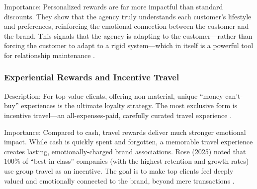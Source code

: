 Importance: Personalized rewards are far more impactful than standard discounts. They show that the agency truly understands each customer's lifestyle and preferences, reinforcing the emotional connection between the customer and the brand. This signals that the agency is adapting to the customer—rather than forcing the customer to adapt to a rigid system—which in itself is a powerful tool for relationship maintenance \cite{othman2025}.

\subsubsection{Experiential Rewards and Incentive Travel}
Description: For top-value clients, offering non-material, unique “money-can't-buy” experiences is the ultimate loyalty strategy. The most exclusive form is incentive travel—an all-expenses-paid, carefully curated travel experience \cite{whalen2017engaging}.

Importance: Compared to cash, travel rewards deliver much stronger emotional impact. While cash is quickly spent and forgotten, a memorable travel experience creates lasting, emotionally-charged brand associations. Rose (2025) noted that 100\% of “best-in-class” companies (with the highest retention and growth rates) use group travel as an incentive. The goal is to make top clients feel deeply valued and emotionally connected to the brand, beyond mere transactions \cite{huang2022enhancing}.
